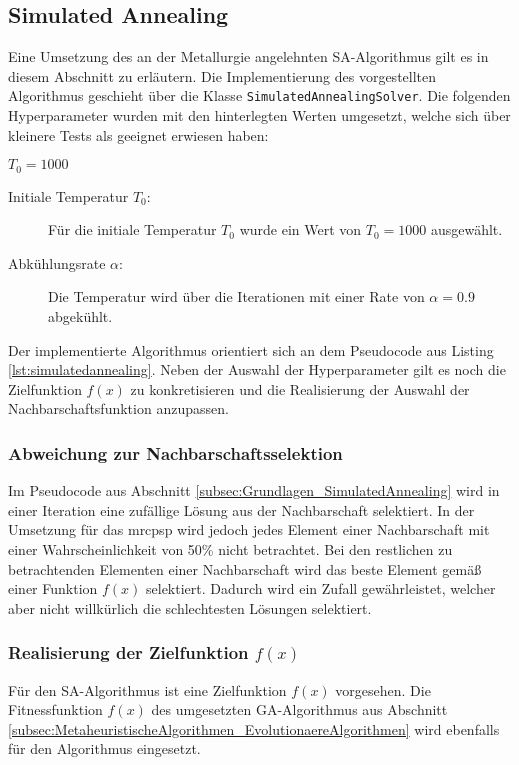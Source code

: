 \subsection{Simulated Annealing} \label{subsec:MetaheuristischeAlgorithmen_SimulatedAnnealing}
Eine Umsetzung des an der Metallurgie angelehnten \ac{SA}-Algorithmus gilt es in diesem Abschnitt zu erläutern. Die Implementierung des vorgestellten Algorithmus geschieht über die Klasse \lstinline|SimulatedAnnealingSolver|. Die folgenden Hyperparameter wurden mit den hinterlegten Werten umgesetzt, welche sich über kleinere Tests als geeignet erwiesen haben:

$T_0 = 1000$

\begin{description}
\item[Initiale Temperatur $T_0$:] Für die initiale Temperatur $T_0$ wurde ein Wert von $T_0 = 1000$ ausgewählt. 
\item[Abkühlungsrate $\alpha$:] Die Temperatur wird über die Iterationen mit einer Rate von $\alpha = 0.9$ abgekühlt. 
\end{description}

Der implementierte Algorithmus orientiert sich an dem Pseudocode aus Listing \ref{lst:simulatedannealing}. Neben der Auswahl der Hyperparameter gilt es noch die Zielfunktion $f(x)$ zu konkretisieren und die Realisierung der Auswahl der Nachbarschaftsfunktion anzupassen. 

\subsubsection*{Abweichung zur Nachbarschaftsselektion}
Im Pseudocode aus Abschnitt \ref{subsec:Grundlagen_SimulatedAnnealing} wird in einer Iteration eine zufällige Lösung aus der Nachbarschaft selektiert. In der Umsetzung für das \ac{mrcpsp} wird jedoch jedes Element einer Nachbarschaft mit einer Wahrscheinlichkeit von 50\% nicht betrachtet. Bei den restlichen zu betrachtenden Elementen einer Nachbarschaft wird das beste Element gemäß einer Funktion $f(x)$ selektiert. Dadurch wird ein Zufall gewährleistet, welcher aber nicht willkürlich die schlechtesten Lösungen selektiert. 

\subsubsection*{Realisierung der Zielfunktion $f(x)$}
Für den \ac{SA}-Algorithmus ist eine Zielfunktion $f(x)$ vorgesehen. Die Fitnessfunktion $f(x)$ des umgesetzten \ac{GA}-Algorithmus aus Abschnitt \ref{subsec:MetaheuristischeAlgorithmen_EvolutionaereAlgorithmen} wird ebenfalls für den Algorithmus eingesetzt. 